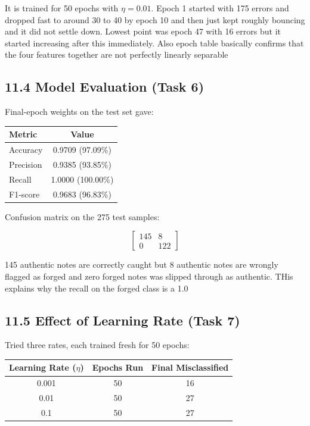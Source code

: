 \documentclass[11pt]{article}
\begin{document}
It is trained for 50 epochs with $\eta = 0.01$. Epoch 1 started with 175 errors and  dropped fast to around 30 to 40 by epoch 10 and then just kept roughly bouncing and it did not settle down. Lowest point was epoch 47 with 16 errors but it started increasing after this immediately. Also epoch table basically confirms that the four features together are not perfectly linearly separable 

\subsection*{11.4 Model Evaluation (Task 6)}

Final-epoch weights on the test set gave:

\begin{center}
\begin{tabular}{|l|c|}
\hline
\textbf{Metric} & \textbf{Value}\\
\hline
Accuracy  & 0.9709 (97.09\%)\\
Precision & 0.9385 (93.85\%)\\
Recall    & 1.0000 (100.00\%)\\
F1-score  & 0.9683 (96.83\%)\\
\hline
\end{tabular}
\end{center}

Confusion matrix on the 275 test samples:

\[
\begin{bmatrix} 145 & 8 \\ 0 & 122 \end{bmatrix}
\]

145 authentic notes are correctly caught but 8 authentic notes are wrongly flagged as forged and zero forged notes was slipped through as authentic. THis explains why the recall on the forged class is a 1.0 
\vspace{0.5cm}
\subsection*{11.5 Effect of Learning Rate (Task 7)}

Tried three rates, each trained fresh for 50 epochs:
\vspace{0.5cm}
\begin{center}
\begin{tabular}{|c|c|c|}
\hline
\textbf{Learning Rate ($\eta$)} & \textbf{Epochs Run} & \textbf{Final Misclassified}\\
\hline
0.001 & 50 & 16\\
0.01  & 50 & 27\\
0.1   & 50 & 27\\
\hline
\end{tabular}
\end{center}
\end{document}
